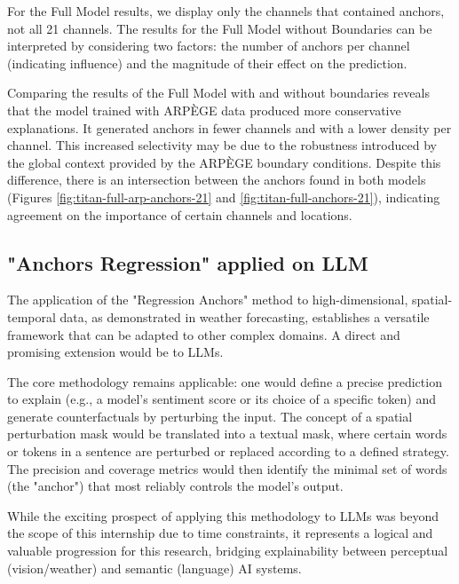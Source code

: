 For the Full Model results, we display only the channels that contained anchors, not all 21 channels. The results for the Full Model without Boundaries can be interpreted by considering two factors: the number of anchors per channel (indicating influence) and the magnitude of their effect on the prediction.

Comparing the results of the Full Model with and without boundaries reveals that the model trained with ARPÈGE data produced more conservative explanations. It generated anchors in fewer channels and with a lower density per channel. This increased selectivity may be due to the robustness introduced by the global context provided by the ARPÈGE boundary conditions. Despite this difference, there is an intersection between the anchors found in both models (Figures \ref{fig:titan-full-arp-anchors-21} and \ref{fig:titan-full-anchors-21}), indicating agreement on the importance of certain channels and locations.



\subsection{"Anchors Regression" applied on LLM}
The application of the "Regression Anchors" method to high-dimensional, spatial-temporal data, as demonstrated in weather forecasting, establishes a versatile framework that can be adapted to other complex domains. A direct and promising extension would be to LLMs.

The core methodology remains applicable: one would define a precise prediction to explain (e.g., a model's sentiment score or its choice of a specific token) and generate counterfactuals by perturbing the input. The concept of a spatial perturbation mask would be translated into a textual mask, where certain words or tokens in a sentence are perturbed or replaced according to a defined strategy. The precision and coverage metrics would then identify the minimal set of words (the "anchor") that most reliably controls the model's output.

While the exciting prospect of applying this methodology to LLMs was beyond the scope of this internship due to time constraints, it represents a logical and valuable progression for this research, bridging explainability between perceptual (vision/weather) and semantic (language) AI systems.